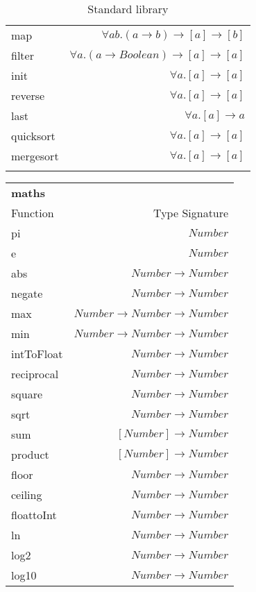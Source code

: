 \begin{longtable}{l r}
    map & $\forall a b. (a \rightarrow b) \rightarrow [a] \rightarrow [b]$ \\
    filter & $\forall a. (a \rightarrow Boolean) \rightarrow [a] \rightarrow [a] $\\
    init & $\forall a. [a] \rightarrow [a]$ \\
    reverse & $\forall a. [a] \rightarrow [a]$ \\
    last & $\forall a. [a] \rightarrow a$ \\
    quicksort & $\forall a. [a] \rightarrow [a]$ \\
    mergesort & $\forall a. [a] \rightarrow [a]$ \\
    \caption{Standard library}
\label{table:standard}
\end{longtable}

\begin{longtable}{l r}
        \rowcolor{light-gray}
        \textbf{maths} & \\
        Function & Type Signature \\
        \hline
        pi & $Number$ \\
        e & $Number$ \\
        abs & $Number \rightarrow Number$ \\
        negate & $Number \rightarrow Number$ \\
        max & $Number \rightarrow Number \rightarrow Number$ \\
        min & $Number \rightarrow Number \rightarrow Number$ \\
        intToFloat & $Number \rightarrow Number$ \\
        reciprocal & $Number \rightarrow Number$ \\
        square & $Number \rightarrow Number$ \\
        sqrt & $Number \rightarrow Number$ \\
        sum & $[Number] \rightarrow Number$ \\
        product & $[Number] \rightarrow Number$ \\
        floor & $Number \rightarrow Number$ \\
        ceiling & $Number \rightarrow Number$ \\
        floattoInt & $Number \rightarrow Number$ \\
        ln & $Number \rightarrow Number$ \\
        log2 & $Number \rightarrow Number$ \\
        log10 & $Number \rightarrow Number$ \\

\end{longtable}
